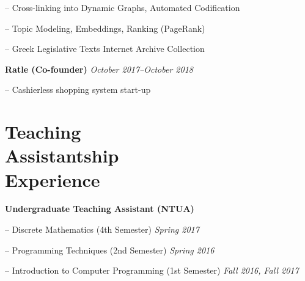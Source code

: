 \documentclass[margin]{res}
\newcommand{\field}[2]{\noindent \textbf{#1} \hfill #2 \\}
\begin{document}
\begin{resume}
\begin{compactitem}
\begin{compactitem}
\item[--] Cross-linking into Dynamic Graphs, Automated Codification
\item[--] Topic Modeling, Embeddings, Ranking (PageRank)
\item[--] Greek Legislative Texts Internet Archive Collection 
\end{compactitem}
\end{compactitem}

\field{Ratle (Co-founder)} {\emph{October 2017--October 2018}}
\begin{compactitem}
\item[--] Cashierless shopping system start-up
\end{compactitem}


\section{Teaching \\ Assistantship \\ Experience} 
\textbf{Undergraduate Teaching Assistant (NTUA)}
\begin{compactitem}
    \item[--] Discrete Mathematics (4th Semester) \hfill \emph{Spring 2017}
    \item[--] Programming Techniques (2nd Semester) \hfill \emph{Spring 2016}
    \item[--] Introduction to Computer Programming (1st Semester) \hfill \emph{Fall 2016, Fall 2017}
\end{compactitem}






\end{resume}
\end{document}
